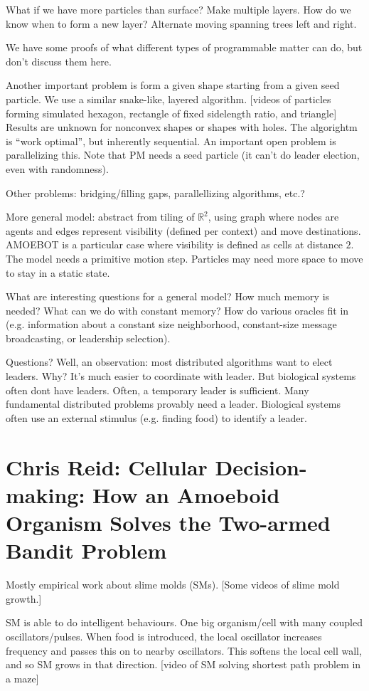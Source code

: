\documentclass{article}
\newcommand{\R}{\mathbb{R}}                         %
\begin{document}
What if we have more particles than surface? Make multiple layers. How do we
know when to form a new layer? Alternate moving spanning trees left and right.

We have some proofs of what different types of programmable matter can do, but
don't discuss them here.

Another important problem is form a given shape starting from a given seed
particle. We use a similar snake-like, layered algorithm. [videos of particles
forming simulated hexagon, rectangle of fixed sidelength ratio, and triangle]
Results are unknown for nonconvex shapes or shapes with holes. The algorightm
is ``work optimal'', but inherently sequential. An important open problem is
parallelizing this. Note that PM needs a seed particle (it can't do leader
election, even with randomness).

Other problems: bridging/filling gaps, parallellizing algorithms, etc.?

More general model: abstract from tiling of $\R^2$, using graph where nodes are
agents and edges represent visibility (defined per context) and move
destinations. AMOEBOT is a particular case where visibility is defined as cells
at distance $2$. The model needs a primitive motion step. Particles may need
more space to move to stay in a static state.

What are interesting questions for a general model? How much memory is needed?
What can we do with constant memory? How do various oracles fit in (e.g.
information about a constant size neighborhood, constant-size message
broadcasting, or leadership selection).

Questions? Well, an observation: most distributed algorithms want to elect
leaders. Why? It's much easier to coordinate with leader. But biological
systems often dont have leaders. Often, a temporary leader is sufficient. Many
fundamental distributed problems provably need a leader. Biological systems
often use an external stimulus (e.g. finding food) to identify a leader.

\section{Chris Reid: Cellular Decision-making: How an Amoeboid Organism Solves
the Two-armed Bandit Problem}

Mostly empirical work about slime molds (SMs). [Some videos of slime mold
growth.]

SM is able to do intelligent behaviours. One big organism/cell with many
coupled oscillators/pulses. When food is introduced, the local oscillator
increases frequency and passes this on to nearby oscillators. This softens the
local cell wall, and so SM grows in that direction. [video of SM solving
shortest path problem in a maze]
\end{document}
